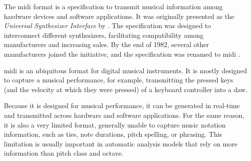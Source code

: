 


The \gls{midi} format is a specification to transmit musical
information among hardware devices and software
applications. It was originally presented as the
\emph{Universal Synthesizer Interface} by
\textcite{smith1981usi}. The specification was designed to
interconnect different synthesizers, facilitating
compatibility among manufacturers and increasing sales. By
the end of 1982, several other manufacturers joined the
initiative, and the specification was renamed to \gls{midi}
\parencite{moog1986midi}.


\gls{midi} is an ubiquitous format for digital musical
instruments. It is mostly designed to capture a musical
performance, for example, transmitting the pressed keys (and
the velocity at which they were pressed) of a keyboard
controller into a \gls{daw}.

Because it is designed for musical performance, it can be
generated in real-time and transmitted across hardware and
software applications. For the same reason, it is also a
very limited format, generally unable to capture music
notation information, such as ties, note durations, pitch
spelling, or phrasing. This limitation is usually important
in automatic analysis models that rely on more information
than pitch class and octave.


